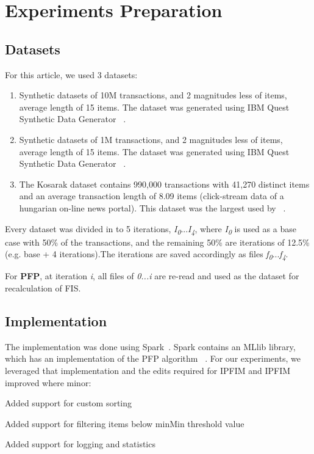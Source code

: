 \section{Experiments Preparation}

\subsection{Datasets}
For this article, we used 3 datasets:
\begin{enumerate}
\item Synthetic datasets of 10M transactions, and 2 magnitudes less of items, average length of 15 items. The dataset was generated using IBM Quest Synthetic Data Generator ~\cite{agrawal1994quest}. 
\item Synthetic datasets of 1M transactions, and 2 magnitudes less of items, average length of 15 items. The dataset was generated using IBM Quest Synthetic Data Generator ~\cite{agrawal1994quest}. 
\item The Kosarak dataset contains 990,000 transactions with 41,270 distinct items and an average transaction length of 8.09 items (click-stream data of a hungarian on-line news portal). This dataset was the largest used by ~\cite{tanbeer2009efficient}.
\end{enumerate}


Every dataset was divided in to 5 iterations, \textit{I\textsubscript{0}}...\textit{I\textsubscript{4}}, where \textit{I\textsubscript{0}} is used as a base case with 50\% of the transactions, and the remaining 50\% are iterations of 12.5\% (e.g. base + 4 iterations).The iterations are saved accordingly as files \textit{f\textsubscript{0}}...\textit{f\textsubscript{4}}. 

For \textbf{PFP}, at iteration \textit{i}, all files of \textit{0...i} are re-read and used as the dataset for recalculation of FIS.

\subsection{Implementation}
The implementation was done using Spark~\cite{spark}. Spark contains an MLlib library, which has an implementation of the PFP algorithm ~\cite{mllibpfp}. For our experiments, we leveraged that implementation and the edits required for IPFIM and IPFIM improved where minor:
\begin{steps}
\item Added support for custom sorting
\item Added support for filtering items below minMin threshold value
\item Added support for logging and statistics
\end{steps}

